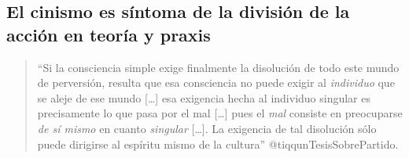 \documentclass[
]{article}
\begin{document}
\hypertarget{el-cinismo-es-suxedntoma-de-la-divisiuxf3n-de-la-acciuxf3n-en-teoruxeda-y-praxis}{%
\subsection{El cinismo es síntoma de la división de la acción en teoría
y
praxis}\label{el-cinismo-es-suxedntoma-de-la-divisiuxf3n-de-la-acciuxf3n-en-teoruxeda-y-praxis}}

\begin{quote}
``Si la consciencia simple exige finalmente la disolución de todo este
mundo de perversión, resulta que esa consciencia no puede exigir al
\emph{individuo} que se aleje de ese mundo {[}\ldots{]} esa exigencia
hecha al individuo singular es precisamente lo que pasa por el mal
{[}\ldots{]} pues el \emph{mal} consiste en preocuparse \emph{de sí
mismo} en cuanto \emph{singular} {[}\ldots{]}. La exigencia de tal
disolución sólo puede dirigirse al espíritu mismo de la cultura''
@tiqqunTesisSobrePartido.
\end{quote}
\end{document}
